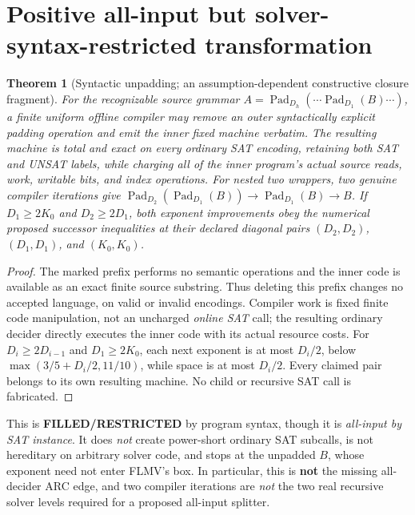 \documentclass[11pt]{article}
\newtheorem{theorem}{Theorem}
\begin{document}
\section*{Positive all-input but solver-syntax-restricted transformation}
\begin{theorem}[Syntactic unpadding; an assumption-dependent constructive closure fragment]
For the \emph{recognizable source grammar} \(A=\operatorname{Pad}_{D_h}(\cdots\operatorname{Pad}_{D_1}(B)\cdots)\), a finite uniform offline compiler may remove an outer syntactically explicit padding operation and emit the inner fixed machine verbatim. The resulting machine is total and exact on \emph{every ordinary SAT encoding}, retaining both SAT and UNSAT labels, while charging all of the inner program's actual source reads, work, writable bits, and index operations. For nested two wrappers, two genuine \emph{compiler} iterations give \(\operatorname{Pad}_{D_2}(\operatorname{Pad}_{D_1}(B))\to\operatorname{Pad}_{D_1}(B)\to B\). If \(D_1\ge2K_0\) and \(D_2\ge2D_1\), both exponent improvements obey the \emph{numerical} proposed successor inequalities at their declared diagonal pairs \((D_2,D_2)\), \((D_1,D_1)\), and \((K_0,K_0)\).
\end{theorem}
\begin{proof}
The marked prefix performs no semantic operations and the inner code is available as an exact finite source substring. Thus deleting this prefix changes no accepted language, on valid or invalid encodings. Compiler work is fixed finite code manipulation, not an uncharged \emph{online SAT} call; the resulting ordinary decider directly executes the inner code with its actual resource costs. For \(D_i\ge2D_{i-1}\) and \(D_1\ge2K_0\), each next exponent is at most \(D_i/2\), below \(\max(3/5+D_i/2,11/10)\), while space is at most \(D_i/2\). Every claimed pair belongs to its own resulting machine. No child or recursive SAT call is fabricated.
\end{proof}
This is \textbf{FILLED/RESTRICTED} by program syntax, though it is \emph{all-input by SAT instance}. It does \emph{not} create power-short ordinary SAT subcalls, is not hereditary on arbitrary solver code, and stops at the unpadded \(B\), whose exponent need not enter FLMV's box. In particular, this is \textbf{not} the missing all-decider ARC edge, and two compiler iterations are \emph{not} the two real recursive solver levels required for a proposed all-input splitter.
\end{document}
